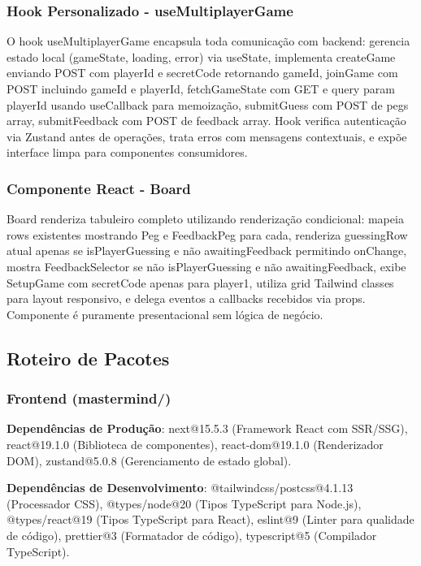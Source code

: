 \documentclass[conference]{IEEEtran}
\begin{document}
\subsubsection{Hook Personalizado - useMultiplayerGame}

O hook useMultiplayerGame encapsula toda comunicação com backend: gerencia estado local (gameState, loading, error) via useState, implementa createGame enviando POST com playerId e secretCode retornando gameId, joinGame com POST incluindo gameId e playerId, fetchGameState com GET e query param playerId usando useCallback para memoização, submitGuess com POST de pegs array, submitFeedback com POST de feedback array. Hook verifica autenticação via Zustand antes de operações, trata erros com mensagens contextuais, e expõe interface limpa para componentes consumidores.

\subsubsection{Componente React - Board}

Board renderiza tabuleiro completo utilizando renderização condicional: mapeia rows existentes mostrando Peg e FeedbackPeg para cada, renderiza guessingRow atual apenas se isPlayerGuessing e não awaitingFeedback permitindo onChange, mostra FeedbackSelector se não isPlayerGuessing e não awaitingFeedback, exibe SetupGame com secretCode apenas para player1, utiliza grid Tailwind classes para layout responsivo, e delega eventos a callbacks recebidos via props. Componente é puramente presentacional sem lógica de negócio.

\subsection{Roteiro de Pacotes}

\subsubsection{Frontend (mastermind/)}

\textbf{Dependências de Produção}: next@15.5.3 (Framework React com SSR/SSG), react@19.1.0 (Biblioteca de componentes), react-dom@19.1.0 (Renderizador DOM), zustand@5.0.8 (Gerenciamento de estado global).

\textbf{Dependências de Desenvolvimento}: @tailwindcss/postcss@4.1.13 (Processador CSS), @types/node@20 (Tipos TypeScript para Node.js), @types/react@19 (Tipos TypeScript para React), eslint@9 (Linter para qualidade de código), prettier@3 (Formatador de código), typescript@5 (Compilador TypeScript).
\end{document}
